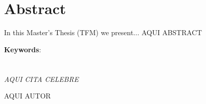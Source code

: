 \chapter{Abstract}
\thispagestyle{empty}

In this Master's Thesis (TFM) we present... 
AQUI ABSTRACT


\vspace{1cm}

\textbf{Keywords}: 

\cleardoublepage %



\chapter*{}
\setlength{\leftmargin}{0.5\textwidth}
\setlength{\parsep}{0cm}
\addtolength{\topsep}{0.5cm}
\begin{flushright}
	\small\em{
		AQUI CITA CELEBRE
	}
\end{flushright}
\begin{flushright}
	\small{
		AQUI AUTOR
	}
\end{flushright}

\cleardoublepage %

